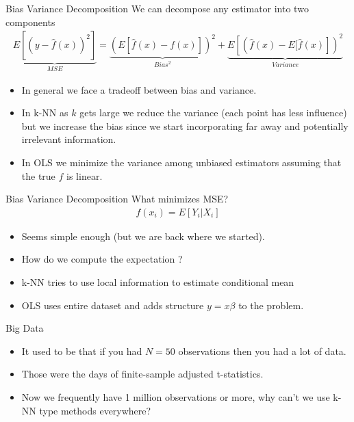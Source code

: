 \documentclass[11pt,handout,xcolor=pdftex,dvipsnames,table,mathserif,aspectratio=169]{beamer}
\begin{document}
\begin{frame}{Bias Variance Decomposition}
We can decompose any estimator into two components
\begin{eqnarray*}
\underbrace{E[(y- \hat{f}(x))^2]}_{MSE} =\underbrace{\left( E[\hat{f}(x) - f(x)] \right)^2}_{Bias^2}  +  \underbrace{E \left[ \left(\hat{f}(x) - E[\hat{f}(x) \right] \right)^2}_{Variance} 
\end{eqnarray*}
\begin{itemize}
\item In general we face a tradeoff between bias and variance.
\item In k-NN as $k$ gets large we reduce the variance (each point has less influence) but we increase the bias since we start incorporating far away and potentially irrelevant information.
\item In OLS we minimize the variance among unbiased estimators assuming that the true $f$ is linear.
\end{itemize}
\end{frame}

\begin{frame}{Bias Variance Decomposition}
What minimizes MSE?
\begin{eqnarray*}
f(x_i) = E[Y_i | X_i] 
\end{eqnarray*}
\begin{itemize}
\item Seems simple enough (but we are back where we started).
\item How do we compute the expectation ?
\item k-NN tries to use local information to estimate conditional mean
\item OLS uses entire dataset and adds structure $ y = x \beta$ to the problem.
\end{itemize}
\end{frame}


\begin{frame}{Big Data}
\begin{itemize}
\item It used to be that if you had $N=50$ observations then you had a lot of data.
\item Those were the days of finite-sample adjusted t-statistics.
\item Now we frequently have 1 million observations or more, why can't we use k-NN type methods everywhere?
\end{itemize}
\end{frame}
\end{document}

